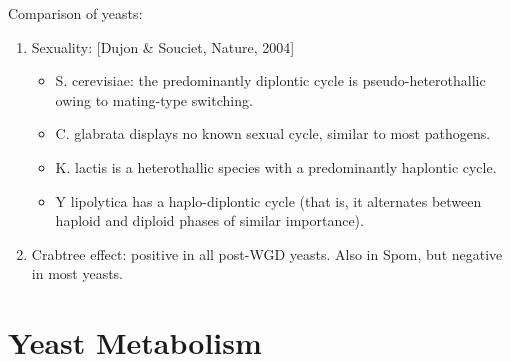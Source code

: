 \documentclass{report}
\begin{document}
Comparison of yeasts: 
\begin{enumerate}
	\item Sexuality: [Dujon \& Souciet, Nature, 2004]
	\begin{itemize}
		\item S. cerevisiae: the predominantly diplontic cycle is pseudo-heterothallic owing to mating-type switching.
		\item C. glabrata displays no known sexual cycle, similar to most pathogens. 
		\item K. lactis is a heterothallic species with a predominantly haplontic cycle. 
		\item Y lipolytica has a haplo-diplontic cycle (that is, it alternates between haploid and diploid phases of similar importance).
	\end{itemize}
	
	\item Crabtree effect: positive in all post-WGD yeasts. Also in Spom, but negative in most yeasts. 
\end{enumerate}

\section{Yeast Metabolism}
\end{document}
